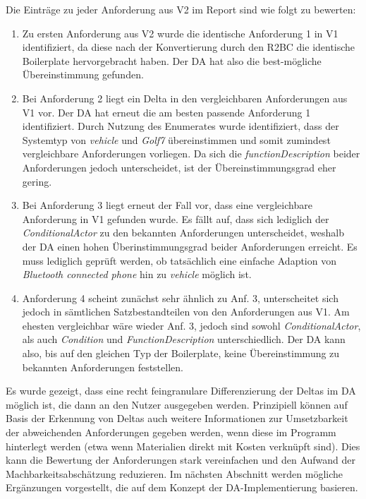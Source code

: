 \documentclass[12pt]{report}
\begin{document}
Die Einträge zu jeder Anforderung aus V2 im Report sind wie folgt zu bewerten:
\begin{enumerate}
\item Zu ersten Anforderung aus V2 wurde die identische Anforderung 1 in V1 identifiziert, da diese nach der Konvertierung durch den R2BC die identische Boilerplate hervorgebracht haben. Der DA hat also die best-mögliche Übereinstimmung gefunden.
\item Bei Anforderung 2 liegt ein Delta in den vergleichbaren Anforderungen aus V1 vor. Der DA hat erneut die am besten passende Anforderung 1 identifiziert. Durch Nutzung des Enumerates wurde identifiziert, dass der Systemtyp von \textit{vehicle} und \textit{Golf7} übereinstimmen und somit zumindest vergleichbare Anforderungen vorliegen. Da sich die \textit{functionDescription} beider Anforderungen jedoch unterscheidet, ist der Übereinstimmungsgrad eher gering.
\item Bei Anforderung 3 liegt erneut der Fall vor, dass eine vergleichbare Anforderung in V1 gefunden wurde. Es fällt auf, dass sich lediglich der \textit{ConditionalActor} zu den bekannten Anforderungen unterscheidet, weshalb der DA einen hohen Überinstimmungsgrad beider Anforderungen erreicht. Es muss lediglich geprüft werden, ob tatsächlich eine einfache Adaption von \textit{Bluetooth connected phone} hin zu \textit{vehicle} möglich ist.
\item Anforderung 4 scheint zunächst sehr ähnlich zu Anf. 3, unterscheitet sich jedoch in sämtlichen Satzbestandteilen von den Anforderungen aus V1. Am ehesten vergleichbar wäre wieder Anf. 3, jedoch sind sowohl \textit{ConditionalActor}, als auch \textit{Condition} und \textit{FunctionDescription} unterschiedlich. Der DA kann also, bis auf den gleichen Typ der Boilerplate, keine Übereinstimmung zu bekannten Anforderungen feststellen.
\end{enumerate}

Es wurde gezeigt, dass eine recht feingranulare Differenzierung der Deltas im DA möglich ist, die dann an den Nutzer ausgegeben werden. Prinzipiell können auf Basis der Erkennung von Deltas auch weitere Informationen zur Umsetzbarkeit der abweichenden Anforderungen gegeben werden, wenn diese im Programm hinterlegt werden (etwa wenn Materialien direkt mit Kosten verknüpft sind). 
Dies kann die Bewertung der Anforderungen stark vereinfachen und den Aufwand der Machbarkeitsabschätzung reduzieren.
Im nächsten Abschnitt werden mögliche Ergänzungen vorgestellt, die auf dem Konzept der DA-Implementierung basieren. 
\end{document}
